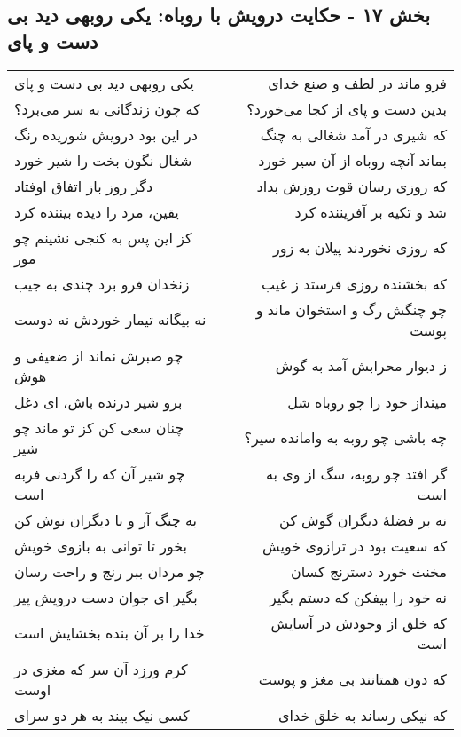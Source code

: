 \begin{center}
\section*{بخش ۱۷ - حکایت درویش با روباه: یکی روبهی دید بی دست و پای}
\label{sec:017}
\begin{longtable}{l p{0.5cm} r}
یکی روبهی دید بی دست و پای
&&
فرو ماند در لطف و صنع خدای
\\
که چون زندگانی به سر می‌برد؟
&&
بدین دست و پای از کجا می‌خورد؟
\\
در این بود درویش شوریده رنگ
&&
که شیری در آمد شغالی به چنگ
\\
شغال نگون بخت را شیر خورد
&&
بماند آنچه روباه از آن سیر خورد
\\
دگر روز باز اتفاق اوفتاد
&&
که روزی رسان قوت روزش بداد
\\
یقین، مرد را دیده بیننده کرد
&&
شد و تکیه بر آفریننده کرد
\\
کز این پس به کنجی نشینم چو مور
&&
که روزی نخوردند پیلان به زور
\\
زنخدان فرو برد چندی به جیب
&&
که بخشنده روزی فرستد ز غیب
\\
نه بیگانه تیمار خوردش نه دوست
&&
چو چنگش رگ و استخوان ماند و پوست
\\
چو صبرش نماند از ضعیفی و هوش
&&
ز دیوار محرابش آمد به گوش
\\
برو شیر درنده باش، ای دغل
&&
مینداز خود را چو روباه شل
\\
چنان سعی کن کز تو ماند چو شیر
&&
چه باشی چو روبه به وامانده سیر؟
\\
چو شیر آن که را گردنی فربه است
&&
گر افتد چو روبه، سگ از وی به است
\\
به چنگ آر و با دیگران نوش کن
&&
نه بر فضلهٔ دیگران گوش کن
\\
بخور تا توانی به بازوی خویش
&&
که سعیت بود در ترازوی خویش
\\
چو مردان ببر رنج و راحت رسان
&&
مخنث خورد دسترنج کسان
\\
بگیر ای جوان دست درویش پیر
&&
نه خود را بیفکن که دستم بگیر
\\
خدا را بر آن بنده بخشایش است
&&
که خلق از وجودش در آسایش است
\\
کرم ورزد آن سر که مغزی در اوست
&&
که دون همتانند بی مغز و پوست
\\
کسی نیک بیند به هر دو سرای
&&
که نیکی رساند به خلق خدای
\\
\end{longtable}
\end{center}
